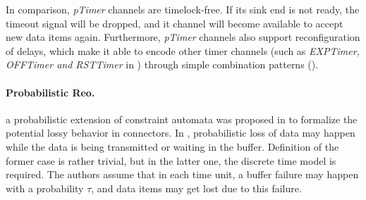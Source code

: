 %         

In comparison, \emph{pTimer} channels are timelock-free. If its sink end is not ready, the timeout signal will be dropped, and it channel will become available to accept new data items again.
Furthermore, \emph{pTimer} channels also support reconfiguration of delays, which make it able to encode other timer channels (such as \emph{EXPTimer, OFFTimer and RSTTimer} in \cite{Meng2012}) through simple combination patterns ().

\paragraph{Probabilistic Reo.}
a probabilistic extension of constraint automata was proposed in \cite{Models2005} to formalize the potential lossy behavior in connectors. In \cite{Models2005}, probabilistic loss of data may happen  while the data is being transmitted or waiting in the buffer. Definition of the former case is rather trivial, but in the latter one, the discrete time model is required. The authors assume that in each time unit, a buffer failure may happen with a probability $\tau$, and data items may get lost due to this failure.

